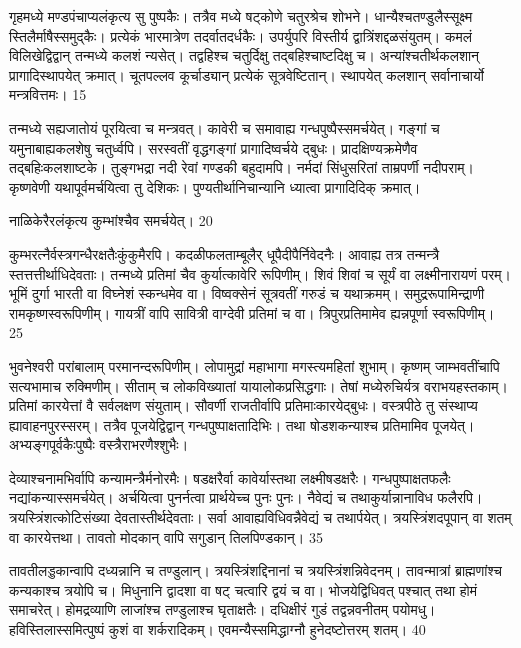   गृहमध्ये मण्डपंचाप्यलंकृत्य सु पुष्पकैः।
 तत्रैव मध्ये षट्कोणे चतुरश्रेच शोभने।
 धान्यैश्चतण्डुलैस्सूक्ष्म स्तिलैर्माषैस्समुद्कैः।
 प्रत्येकं भारमात्रेण तदर्वातदर्धकैः।
 उपर्युपरि विस्तीर्य द्वात्रिंशद्दळसंयुतम्।
 कमलं विलिखेद्विद्वान् तन्मध्ये कलशं न्यसेत्।
 तद्वहिश्च चतुर्दिक्षु तद्बहिश्चाष्टदिक्षु च।
 अन्यांश्चतीर्थकलशान् प्रागादिस्थापयेत् क्रमात्।
 चूतपल्लव कूर्चाड्यान् प्रत्येकं सूत्रवेष्टितान्।
 स्थापयेत् कलशान् सर्वानाचार्यो मन्त्रवित्तमः।
 15

  तन्मध्ये सह्यजातोयं पूरयित्वा च मन्त्रवत्।
 कावेरी च समावाह्य गन्धपुष्पैस्समर्चयेत्।
 गङ्गां च यमुनाबाह्यकलशेषु चतुर्ध्वपि।
 सरस्वतीं वृद्धगङ्गां प्रागादिष्वर्चये द्बुधः।
 प्रादक्षिण्यक्रमेणैव तद्बहिःकलशाष्टके।
 तुङ्गभद्रा नदी रेवां गण्डकी बहुदामपि।
 नर्मदां सिंधुसरितां ताम्रपर्णी नदीपराम्।
 कृष्णवेणी यथापूर्वमर्चयित्वा तु देशिकः।
 पुण्यतीर्थानिचान्यानि ध्यात्वा प्रागादिदिक् क्रमात्।
 
नाळिकेरैरलंकृत्य कुम्भांश्चैव समर्चयेत्।
 20

  कुम्भरत्नैर्वस्त्रगन्धैरक्षतैःकुंकुमैरपि।
 कदळीफलताम्बूलैर् धूपैदीपैर्निवेदनैः।
 आवाह्य तत्र तन्मन्त्रै स्तत्तत्तीर्थाधिदेवताः।
 तन्मध्ये प्रतिमां चैव कुर्यात्कावेरि रूपिणीम्।
 शिवं शिवां च सूर्यं वा लक्ष्मीनारायणं परम्।
 भूमिं दुर्गा भारती वा विघ्नेशं स्कन्धमेव वा।
 विष्वक्सेनं सूत्रवतीं गरुडं च यथाक्रमम्।
 समुद्ररूपामिन्द्राणी रामकृष्णस्वरूपिणीम्।
 गायत्रीं वापि सावित्री वाग्देवी प्रतिमां च वा।
 त्रिपुरप्रतिमामेव ह्यन्नपूर्णा स्वरूपिणीम्।
 25

  भुवनेश्वरी परांबालाम् परमानन्दरूपिणीम्।
 लोपामुद्रां महाभागा मगस्त्यमहितां शुभाम्।
 कृष्णम् जाम्भवतींचापि सत्यभामाच रुक्मिणीम्।
 सीताम् च लोकविख्यातां यायालोकप्रसिद्धगाः।
 तेषां मध्येरुचिर्यत्र वराभयहस्तकाम्।
 प्रतिमां कारयेत्तां वै सर्वलक्षण संयुताम्।
 सौवर्णी राजतीर्वापि प्रतिमाःकारयेद्बुधः।
 वस्त्रपीठे तु संस्थाप्य ह्यावाहनपुरस्सरम्।
 तत्रैव पूजयेद्विद्वान् गन्धपुष्पाक्षतादिभिः।
 तथा षोडशकन्याश्च प्रतिमामिव पूजयेत्।
 अभ्यङ्गपूर्वकैःपुष्पैः वस्त्रैराभरणैश्शुभैः।
 
देव्याश्चनामभिर्वापि कन्यामन्त्रैर्मनोरमैः।
 षडक्षरैर्वा कावेर्यास्तथा लक्ष्मीषडक्षरैः।
 गन्धपुष्पाक्षतफलैः नद्यांकन्यास्समर्चयेत्।
 अर्चयित्वा पुनर्नत्वा प्रार्थयेच्च पुनः पुनः।
 नैवेद्यं च तथाकुर्यान्नानाविध फलैरपि।
 त्रयस्त्रिंशत्कोटिसंख्या देवतास्तीर्थदेवताः।
 सर्वा आवाह्यविधिवन्नैवेद्यं च तथार्पयेत्।
 त्रयस्त्रिंशदपूपान् वा शतम् वा कारयेत्तथा।
 तावतो मोदकान् वापि सगुडान् तिलपिण्डकान्।
 35

  तावतीलड्डकान्वापि दध्यन्नानि च तण्डुलान्।
 त्रयस्त्रिंशद्दिनानां च त्रयस्त्रिंशन्निवेदनम्।
 तावन्मात्रां ब्राह्मणांश्च कन्यकाश्च त्रयोपि च।
 मिधुनानि द्वादशा वा षट् चत्वारि द्वयं च वा।
 भोजयेद्विधिवत् पश्चात् तथा होमं समाचरेत्।
 होमद्रव्याणि लाजांश्च तण्डुलाश्च घृताक्षतैः।
 दधिक्षीरं गुडं तद्वन्नवनीतम् पयोमधु।
 हविस्तिलास्समित्पुष्पं कुशं वा शर्करादिकम्।
 एवमन्यैस्समिद्धाग्नौ हुनेदष्टोत्तरम् शतम्।
 40

